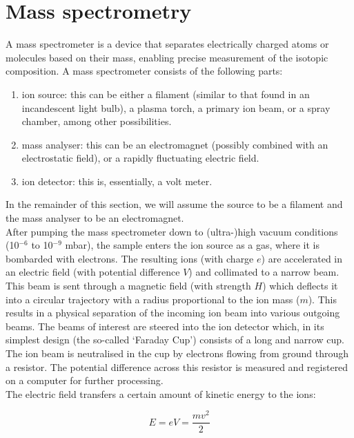 \documentclass{book}
\begin{document}
\section{Mass spectrometry}
\label{sec:mass-specs}

A mass spectrometer is a device that separates electrically charged
atoms or molecules based on their mass, enabling precise measurement
of the isotopic composition. A mass spectrometer consists of the
following parts:

\begin{enumerate}
\item ion source: this can be either a filament (similar to that found
  in an incandescent light bulb), a plasma torch, a primary ion beam,
  or a spray chamber, among other possibilities.
\item mass analyser: this can be an electromagnet (possibly combined
  with an electrostatic field), or a rapidly fluctuating electric
  field.
\item ion detector: this is, essentially, a volt meter.
\end{enumerate}

In the remainder of this section, we will assume the source to be a
filament and the mass analyser to be an electromagnet. \\

After pumping the mass spectrometer down to (ultra-)high vacuum
conditions (10$^{-6}$ to 10$^{-9}$ mbar), the sample enters the ion
source as a gas, where it is bombarded with electrons.  The resulting
ions (with charge $e$) are accelerated in an electric field (with
potential difference $V$) and collimated to a narrow beam. This beam
is sent through a magnetic field (with strength $H$) which deflects it
into a circular trajectory with a radius proportional to the ion mass
($m$).  This results in a physical separation of the incoming ion beam
into various outgoing beams. The beams of interest are steered into
the ion detector which, in its simplest design (the so-called `Faraday
Cup') consists of a long and narrow cup. The ion beam is neutralised
in the cup by electrons flowing from ground through a resistor. The
potential difference across this resistor is measured and registered
on a computer for further processing.\\

The electric field transfers a certain amount of kinetic energy to the
ions:

\begin{equation}
E = e V = \frac{m v^2}{2}
\label{eq:E}
\end{equation}
\end{document}
